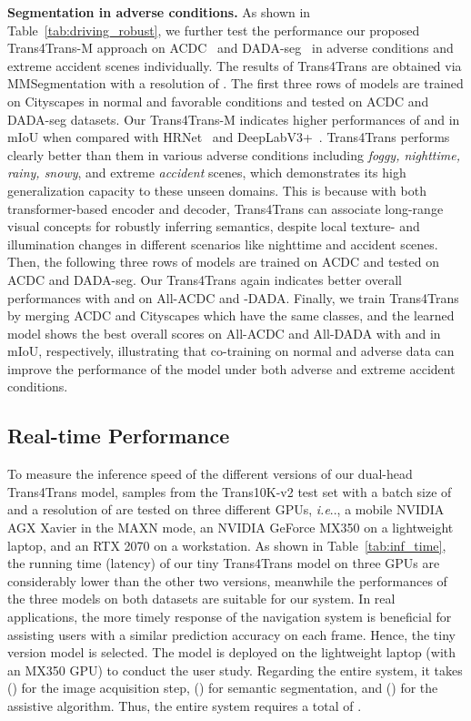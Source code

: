 \documentclass[journal]{IEEEtran}
\makeatletter
\DeclareRobustCommand\onedot{\futurelet\@let@token\@onedot}
\def\@onedot{\ifx\@let@token.\else.\null\fi\xspace}
\def\ie{\emph{i.e}\onedot} \def\Ie{\emph{I.e}\onedot}
\makeatother
\begin{document}
\noindent\textbf{Segmentation in adverse conditions.}
As shown in Table~\ref{tab:driving_robust}, we further test the performance our proposed Trans4Trans-M approach on ACDC~\cite{sakaridis2021acdc} and DADA-seg~\cite{zhang2021issafe} in adverse conditions and extreme accident scenes individually. The results of Trans4Trans are obtained via MMSegmentation with a resolution of . The first three rows of models are trained on Cityscapes in normal and favorable conditions and tested on ACDC and DADA-seg datasets. Our Trans4Trans-M indicates higher performances of  and  in mIoU when compared with HRNet~\cite{hrnet} and DeepLabV3+~\cite{deeplabv3+}. Trans4Trans performs clearly better than them in various adverse conditions including \emph{foggy, nighttime, rainy, snowy}, and extreme \emph{accident} scenes, which demonstrates its high generalization capacity to these unseen domains. This is because with both transformer-based encoder and decoder, Trans4Trans can associate long-range visual concepts for robustly inferring semantics, despite local texture- and illumination changes in different scenarios like nighttime and accident scenes. Then, the following three rows of models are trained on ACDC and tested on ACDC and DADA-seg. Our Trans4Trans again indicates better overall performances with  and  on All-ACDC and -DADA. Finally, we train Trans4Trans by merging ACDC and Cityscapes which have the same  classes, and the learned model shows the best overall scores on All-ACDC and All-DADA with  and  in mIoU, respectively, illustrating that co-training on normal and adverse data can improve the performance of the model under both adverse and extreme accident conditions.

\subsection{Real-time Performance}
\label{sec:realtime}
To measure the inference speed of the different versions of our dual-head Trans4Trans model,  samples from the Trans10K-v2 test set with a batch size of  and a resolution of  are tested on three different GPUs, \ie, a mobile NVIDIA AGX Xavier in the MAXN mode, an NVIDIA GeForce MX350 on a lightweight laptop, and an RTX 2070 on a workstation. As shown in Table~\ref{tab:inf_time}, the running time (latency) of our tiny Trans4Trans model on three GPUs are considerably lower than the other two versions, meanwhile the performances of the three models on both datasets are suitable for our system. In real applications, the more timely response of the navigation system is beneficial for assisting users with a similar prediction accuracy on each frame. Hence, the tiny version model is selected. The model is deployed on the lightweight laptop (with an MX350 GPU) to conduct the user study. Regarding the entire system, it takes  () for the image acquisition step,  () for semantic segmentation, and  () for the assistive algorithm. Thus, the entire system requires a total of . 
\end{document}
